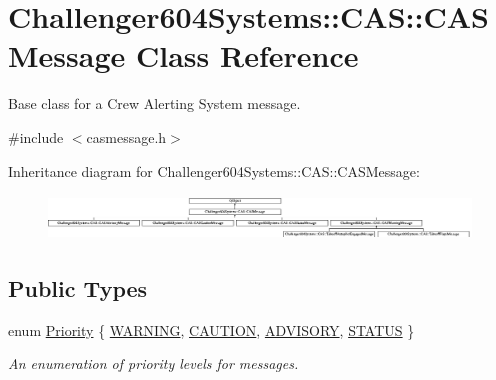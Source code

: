 \hypertarget{class_challenger604_systems_1_1_c_a_s_1_1_c_a_s_message}{\section{Challenger604\-Systems\-:\-:C\-A\-S\-:\-:C\-A\-S\-Message Class Reference}
\label{class_challenger604_systems_1_1_c_a_s_1_1_c_a_s_message}
}


Base class for a Crew Alerting System message.  




{\ttfamily \#include $<$casmessage.\-h$>$}

Inheritance diagram for Challenger604\-Systems\-:\-:C\-A\-S\-:\-:C\-A\-S\-Message\-:\begin{figure}[H]
\begin{center}
\leavevmode
\includegraphics[height=1.182058cm]{class_challenger604_systems_1_1_c_a_s_1_1_c_a_s_message}
\end{center}
\end{figure}
\subsection*{Public Types}
\begin{DoxyCompactItemize}
\item 
enum \hyperlink{class_challenger604_systems_1_1_c_a_s_1_1_c_a_s_message_a5a503c8cb9618403fcd342dca9ba1ca9}{Priority} \{ \hyperlink{class_challenger604_systems_1_1_c_a_s_1_1_c_a_s_message_a5a503c8cb9618403fcd342dca9ba1ca9aa8160364c5aa91101b50e493e5a8b13c}{W\-A\-R\-N\-I\-N\-G}, 
\hyperlink{class_challenger604_systems_1_1_c_a_s_1_1_c_a_s_message_a5a503c8cb9618403fcd342dca9ba1ca9a6fa1e30565258a490a57432d15b59295}{C\-A\-U\-T\-I\-O\-N}, 
\hyperlink{class_challenger604_systems_1_1_c_a_s_1_1_c_a_s_message_a5a503c8cb9618403fcd342dca9ba1ca9a10aca7ce6d424c54c78489f7ec2a7bef}{A\-D\-V\-I\-S\-O\-R\-Y}, 
\hyperlink{class_challenger604_systems_1_1_c_a_s_1_1_c_a_s_message_a5a503c8cb9618403fcd342dca9ba1ca9a6a31a04097fb1143feb1d1b86aba4ca9}{S\-T\-A\-T\-U\-S}
 \}
\begin{DoxyCompactList}\small\item\em An enumeration of priority levels for messages. \end{DoxyCompactList}\end{DoxyCompactItemize}
